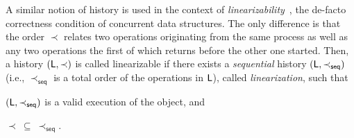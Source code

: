 A similar notion of history is used in the context of \emph{linearizability}~\cite{HerlihyW90}, 
the de-facto correctness condition of concurrent data structures.
The only difference is that the order $\prec$ relates two operations originating from the same process
as well as any two operations the first of which returns before the
other one started. Then, a history $(\mathsf{L}, \prec)$ is called linearizable
if there exists a \emph{sequential} history $(\mathsf{L}, \prec_{\mathsf{seq}})$ (i.e., $\prec_{\mathsf{seq}}$ is a total order of the operations in
  $\mathsf{L}$), called \emph{linearization},
such that
\begin{inparaenum}[(i)]
\item $(\mathsf{L}, \prec_{\mathsf{seq}})$ is a valid execution of the object, and
\item $ \prec\ \subseteq\ \prec_{\mathsf{seq}}$.
\end{inparaenum}
%
%

